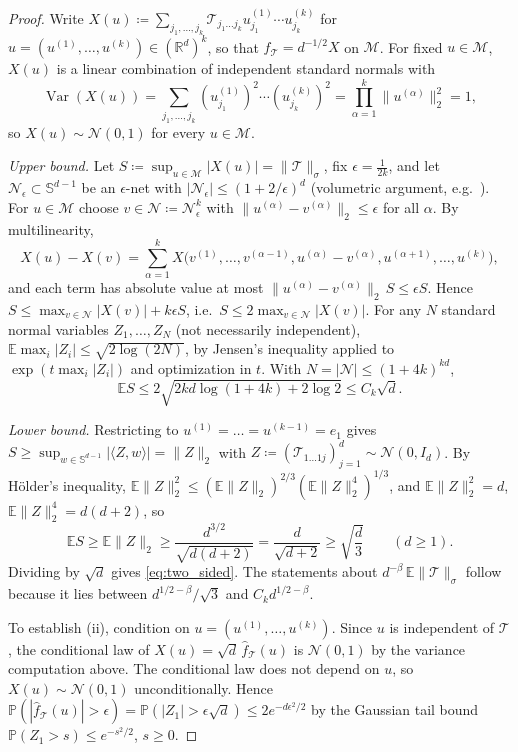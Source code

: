 \documentclass[11pt,a4paper,reqno]{amsart}
\theoremstyle{definition}
\numberwithin{equation}{section}
\newcommand{\R}{\mathbb{R}}
\newcommand{\Sph}{\mathbb{S}}
\begin{document}
\begin{proof}
Write $X(u) \coloneqq \sum_{j_1, \dots, j_k} \mathcal{T}_{j_1 \dots j_k} u_{j_1}^{(1)} \cdots u_{j_k}^{(k)}$ for $u = (u^{(1)}, \dots, u^{(k)}) \in (\R^d)^k$, so that $\widehat{f}_{\mathcal{T}} = d^{-1/2} X$ on $\mathcal{M}$. For fixed $u \in \mathcal{M}$, $X(u)$ is a linear combination of independent standard normals with
\begin{equation}
    \operatorname{Var}(X(u)) = \sum_{j_1, \dots, j_k} (u_{j_1}^{(1)})^2 \cdots (u_{j_k}^{(k)})^2 = \prod_{\alpha=1}^k \|u^{(\alpha)}\|_2^2 = 1,
\end{equation}
so $X(u) \sim \mathcal{N}(0,1)$ for every $u \in \mathcal{M}$.

\emph{Upper bound.} Let $S \coloneqq \sup_{u \in \mathcal{M}} |X(u)| = \|\mathcal{T}\|_\sigma$, fix $\epsilon = \frac{1}{2k}$, and let $\mathcal{N}_\epsilon \subset \Sph^{d-1}$ be an $\epsilon$-net with $|\mathcal{N}_\epsilon| \le (1 + 2/\epsilon)^d$ (volumetric argument, e.g.~\cite[\S4.2]{vershynin2018high}). For $u \in \mathcal{M}$ choose $v \in \mathcal{N} \coloneqq \mathcal{N}_\epsilon^k$ with $\|u^{(\alpha)} - v^{(\alpha)}\|_2 \le \epsilon$ for all $\alpha$. By multilinearity,
\[
X(u) - X(v) = \sum_{\alpha=1}^k X\big(v^{(1)}, \dots, v^{(\alpha-1)}, u^{(\alpha)} - v^{(\alpha)}, u^{(\alpha+1)}, \dots, u^{(k)}\big),
\]
and each term has absolute value at most $\|u^{(\alpha)} - v^{(\alpha)}\|_2\, S \le \epsilon S$. Hence $S \le \max_{v \in \mathcal{N}} |X(v)| + k\epsilon S$, i.e.\ $S \le 2 \max_{v \in \mathcal{N}} |X(v)|$. For any $N$ standard normal variables $Z_1, \dots, Z_N$ (not necessarily independent), $\mathbb{E}\max_i |Z_i| \le \sqrt{2 \log (2N)}$, by Jensen's inequality applied to $\exp(t \max_i |Z_i|)$ and optimization in $t$. With $N = |\mathcal{N}| \le (1 + 4k)^{kd}$,
\[
\mathbb{E} S \le 2 \sqrt{2 kd \log(1 + 4k) + 2 \log 2} \le C_k \sqrt{d}.
\]

\emph{Lower bound.} Restricting to $u^{(1)} = \dots = u^{(k-1)} = e_1$ gives $S \ge \sup_{w \in \Sph^{d-1}} |\langle Z, w\rangle| = \|Z\|_2$ with $Z \coloneqq (\mathcal{T}_{1 \dots 1 j})_{j=1}^d \sim \mathcal{N}(0, I_d)$. By H\"older's inequality, $\mathbb{E}\|Z\|_2^2 \le (\mathbb{E}\|Z\|_2)^{2/3} (\mathbb{E}\|Z\|_2^4)^{1/3}$, and $\mathbb{E}\|Z\|_2^2 = d$, $\mathbb{E}\|Z\|_2^4 = d(d+2)$, so
\[
\mathbb{E} S \ge \mathbb{E}\|Z\|_2 \ge \frac{d^{3/2}}{\sqrt{d(d+2)}} = \frac{d}{\sqrt{d+2}} \ge \sqrt{\frac{d}{3}} \qquad (d \ge 1).
\]
Dividing by $\sqrt{d}$ gives \eqref{eq:two_sided}. The statements about $d^{-\beta}\,\mathbb{E}\|\mathcal{T}\|_\sigma$ follow because it lies between $d^{1/2 - \beta}/\sqrt{3}$ and $C_k d^{1/2-\beta}$.

To establish (ii), condition on $u = (u^{(1)}, \dots, u^{(k)})$. Since $u$ is independent of $\mathcal{T}$, the conditional law of $X(u) = \sqrt{d}\,\widehat{f}_{\mathcal{T}}(u)$ is $\mathcal{N}(0,1)$ by the variance computation above. The conditional law does not depend on $u$, so $X(u) \sim \mathcal{N}(0,1)$ unconditionally. Hence $\mathbb{P}(|\widehat{f}_{\mathcal{T}}(u)| > \epsilon) = \mathbb{P}(|Z_1| > \epsilon\sqrt{d}) \le 2 e^{-d\epsilon^2/2}$ by the Gaussian tail bound $\mathbb{P}(Z_1 > s) \le e^{-s^2/2}$, $s \ge 0$.
\end{proof}
\end{document}
